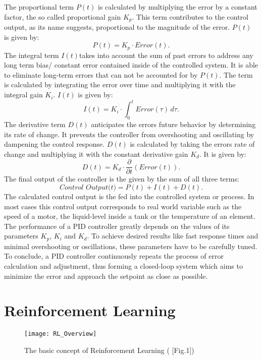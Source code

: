 The proportional term $P(t)$ is calculated by multiplying the error by a constant factor, the so called proportional gain $K_p$.
This term contributes to the control output, as its name suggests, proportional to the magnitude of the error.
$P(t)$ is given by:
\[
	P(t) = K_p \cdot Error(t)
.\]
The integral term $I(t)$takes into account the sum of past errors to address any long term bias/ constant error contained inside of the controlled system.
It is able to eliminate long-term errors that can not be accounted for by $P(t)$.
The term is calculated by integrating the error over time and multiplying it with the integral gain $K_i$.
$I(t)$ is given by:
\[
	I(t) = K_i \cdot \int_{0}^{t} Error(\tau) \,d\tau
.\]
The derivative term $D(t)$ anticipates the errors future behavior by determining its rate of change.
It prevents the controller from overshooting and oscillating by dampening the control response.
$D(t)$ is calculated by taking the errors rate of change and multiplying it with the constant derivative gain $K_d$.
It is given by:
\[
	D(t) = K_d \cdot \frac{\partial}{\partial t}(Error(t))
.\]
The final output of the controller is the given by the sum of all three terms:
\[
	\textit{Control Output(t)} = P(t) + I(t) + D(t)
.\]
The calculated control output is the fed into the controlled system or process.
In most cases this control output corresponds to real world variable such as the speed of a motor, the liquid-level inside a tank or the temperature of an element.
The performance of a PID controller greatly depends on the values of its parameters $K_p$, $K_i$ and $K_d$.
To achieve desired results like fast response times and minimal overshooting or oscillations, these parameters have to be carefully tuned. 
To conclude, a PID controller continuously repeats the process of error calculation and adjustment, thus forming a closed-loop system which aims to minimize the error and approach the setpoint as close as possible.




\section{Reinforcement Learning}

\begin{figure}
	\centerline{\texttt{[image: RL\_Overview]}}
	\caption{The basic concept of Reinforcement Learning (\cite{weng2018bandit} [Fig.1])}
	\label{RL Illustration}
\end{figure}

